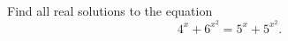 \begin{problem}
    Find all real solutions to the equation
    \[
        4^{x} + 6^{x^{2}} = 5^{x} + 5^{x^{2}}.
    \]
\end{problem}
